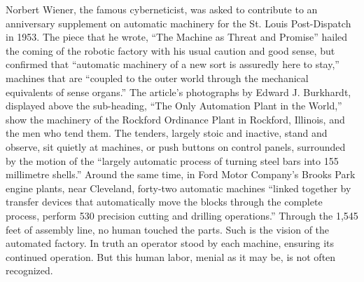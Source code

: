 Norbert Wiener, the famous cyberneticist, was asked to contribute to an
anniversary supplement on automatic machinery for the St. Louis
Post-Dispatch in 1953. The piece that he wrote, ``The Machine as Threat
and Promise''\cite{???-wienerMachineThreat} hailed the coming of the
robotic factory with his usual 
caution and good sense, but confirmed that ``automatic machinery of a
new sort is assuredly here to stay,'' machines that are ``coupled to the
outer world through the mechanical equivalents of sense organs.'' The
article's photographs by Edward J. Burkhardt, displayed above the
sub-heading, ``The Only Automation Plant in the World,'' show the
machinery of the Rockford Ordinance Plant in Rockford, Illinois, and
the men who tend them. The tenders, largely stoic and inactive, stand
and observe, sit quietly at machines, or push buttons on control
panels, surrounded by the motion of the ``largely automatic process of
turning steel bars into 155 millimetre
shells.''\cite{???-wienerMachineThreat} Around the same time, in Ford
Motor Company's Brooks Park engine plants, near Cleveland, forty-two
automatic machines ``linked together by transfer devices that
automatically move the blocks through the complete process, perform
530 precision cutting and drilling operations.''\cite[p.
  9]{dieboldImpact} Through the 1,545 feet of assembly line, no human
touched the parts. Such is the vision of the automated factory. In
truth an operator stood by each machine, ensuring its continued
operation. But this human labor, menial as it may be, is not often recognized.

